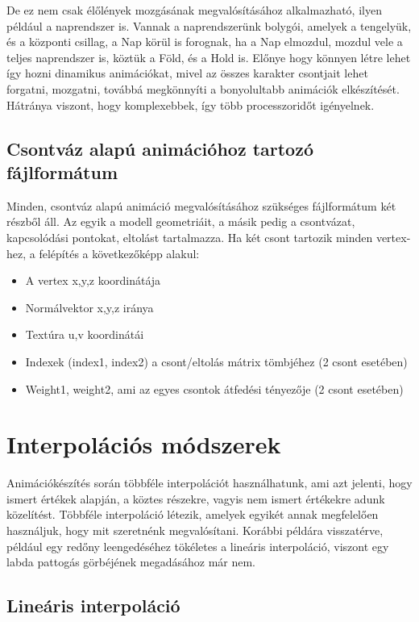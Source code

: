 De ez nem csak élőlények mozgásának megvalósításához alkalmazható, ilyen például a naprendszer is. Vannak a naprendszerünk bolygói, amelyek a tengelyük, és a központi csillag, a Nap körül is forognak, ha a Nap elmozdul, mozdul vele a teljes naprendszer is, köztük a Föld, és a Hold is. Előnye hogy könnyen létre lehet így hozni dinamikus animációkat, mivel az összes karakter csontjait lehet forgatni, mozgatni, továbbá megkönnyíti a bonyolultabb animációk elkészítését. Hátránya viszont, hogy komplexebbek, így több processzoridőt igényelnek.

\subsection{Csontváz alapú animációhoz tartozó fájlformátum}

Minden, csontváz alapú animáció megvalósításához szükséges fájlformátum két részből áll. Az egyik a modell geometriáit, a másik pedig a csontvázat, kapcsolódási pontokat, eltolást tartalmazza. Ha két csont tartozik minden vertex-hez, a felépítés a következőképp alakul:
\begin{itemize}
\item A vertex x,y,z koordinátája
\item Normálvektor x,y,z iránya
\item Textúra u,v koordinátái
\item Indexek (index1, index2) a csont/eltolás mátrix tömbjéhez (2 csont esetében)
\item Weight1, weight2, ami az egyes csontok átfedési tényezője (2 csont esetében)
\end{itemize}

\section{Interpolációs módszerek}


Animációkészítés során többféle interpolációt használhatunk, ami azt jelenti, hogy ismert értékek alapján, a köztes részekre, vagyis nem ismert értékekre adunk közelítést. Többféle interpoláció létezik, amelyek egyikét annak megfelelően használjuk, hogy mit szeretnénk megvalósítani. Korábbi példára visszatérve, például egy redőny leengedéséhez tökéletes a lineáris interpoláció, viszont egy labda pattogás görbéjének megadásához már nem.

\subsection{Lineáris interpoláció}

